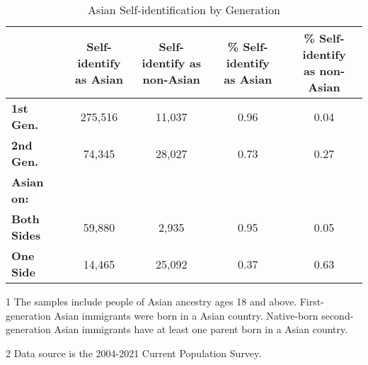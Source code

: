\begin{table}[H]
\centering\centering
\caption{Asian Self-identification by Generation \label{tab:hispbygen-adults}}
\centering
\begin{threeparttable}
\begin{tabular}[t]{>{}lcccc}
\toprule
  & \specialcell{Self-identify \\ as Asian} & \specialcell{Self-identify as \\ non-Asian} & \specialcell{\% Self-identify \\ as Asian} & \specialcell{\% Self-identify \\ as non-Asian}\\
\midrule
\textbf{1st Gen.} & 275,516 & 11,037 & 0.96 & 0.04\\
\textbf{2nd Gen.} & 74,345 & 28,027 & 0.73 & 0.27\\
\hspace{1em}\textbf{Asian on:} &  &  &  & \\
\hspace{1em}\hspace{1em}\textbf{Both Sides} & 59,880 & 2,935 & 0.95 & 0.05\\
\hspace{1em}\hspace{1em}\textbf{One Side} & 14,465 & 25,092 & 0.37 & 0.63\\
\bottomrule
\end{tabular}
\begin{tablenotes}
\item[1] The samples include people of Asian ancestry ages 18 and above. First-generation Asian immigrants were born in a Asian country. Native-born second-generation Asian immigrants have at least one parent born in a Asian country. 
\item[2] Data source is the 2004-2021 Current Population Survey.
\end{tablenotes}
\end{threeparttable}
\end{table}

